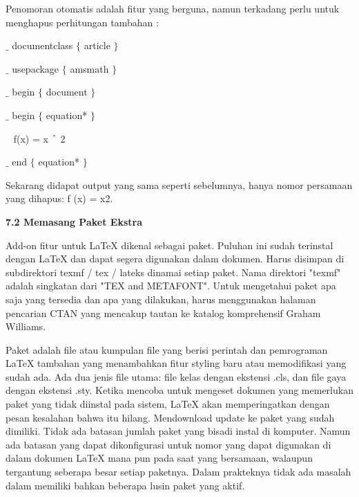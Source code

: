 Penomoran otomatis adalah fitur yang berguna, namun terkadang perlu untuk menghapus perhitungan tambahan :\par

{\fontsize{10pt}{10pt}\selectfont  $ \_ $ documentclass $ \{ $ article $ \} $ }\par

{\fontsize{10pt}{10pt}\selectfont  $ \_ $ usepackage $ \{ $ amsmath $ \} $ }\par

{\fontsize{10pt}{10pt}\selectfont  $ \_ $ begin $ \{ $ document $ \} $ }\par

{\fontsize{10pt}{10pt}\selectfont  $ \_ $ begin $ \{ $ equation* $ \} $ }\par

{\fontsize{10pt}{10pt}\selectfont ~ f(x) = x $ \string^ $ 2}\par

{\fontsize{10pt}{10pt}\selectfont  $ \_ $ end $ \{ $ equation* $ \} $ }\par

\noindent Sekarang didapat output yang sama seperti sebelumnya, hanya nomor persamaan yang dihapus: f (x) = x2.\par

\vspace{12pt}
\noindent \textbf{7.2 Memasang Paket Ekstra}\par
Add-on fitur untuk LaTeX dikenal sebagai paket. Puluhan ini sudah terinstal dengan LaTeX dan dapat segera digunakan dalam dokumen. Harus disimpan di subdirektori texmf / tex / lateks dinamai setiap paket. Nama direktori "texmf" adalah singkatan dari "TEX and METAFONT". Untuk mengetahui paket apa saja yang tersedia dan apa yang dilakukan, harus menggunakan halaman pencarian CTAN yang mencakup tautan ke katalog komprehensif Graham Williams.\par

Paket adalah file atau kumpulan file yang berisi perintah dan pemrograman LaTeX tambahan yang menambahkan fitur styling baru atau memodifikasi yang sudah ada. Ada dua jenis file utama: file kelas dengan ekstensi .cls, dan file gaya dengan ekstensi .sty. Ketika mencoba untuk mengeset dokumen yang memerlukan paket yang tidak diinstal pada sistem, LaTeX akan memperingatkan dengan pesan kesalahan bahwa itu hilang. Mendownload update ke paket yang sudah dimiliki. Tidak ada batasan jumlah paket yang bisadi instal di komputer. Namun ada batasan yang dapat dikonfigurasi untuk nomor yang dapat digunakan di dalam dokumen LaTeX mana pun pada saat yang bersamaan, walaupun tergantung seberapa besar setiap paketnya. Dalam prakteknya tidak ada masalah dalam memiliki bahkan beberapa lusin paket yang aktif.\par

